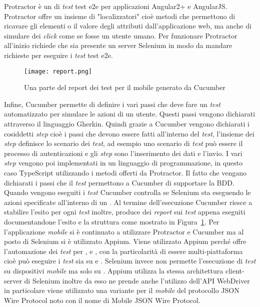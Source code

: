 Protractor è un  di \emph{test} \gls{test e2e} per applicazioni Angular2+ e AngularJS. Protractor offre un insieme di "localizzatori" cioè metodi che permettono di ricavare gli elementi o il valore degli attributi dall'applicazione web, ma anche di simulare dei \emph{click} come se fosse un utente umano. Per funzionare Protractor all'inizio richiede che sia presente un server Selenium in modo da mandare richieste  per eseguire i \emph{test} \gls{test e2e}.\\

\begin{figure}[h] 
	\begin{center}
		\texttt{[image: report.png]}
		\caption{Una parte del report dei test per il mobile generato da Cucumber}\label{fig:testDoc}
	\end{center}
\end{figure}

Infine, Cucumber permette di definire i vari passi che deve fare un \emph{test} automatizzato per simulare le azioni di un utente. Questi passi vengono dichiarati attraverso il linguaggio Gherkin. Quindi grazie a Cucumber vengono dichiarati i cosiddetti \emph{step} cioè i passi che devono essere fatti all'interno del \emph{test}, l'insieme dei \emph{step} definisce lo scenario dei \emph{test}, ad esempio uno scenario di \emph{test} può essere il processo di autenticazioni e gli \emph{step} sono l'inserimento dei dati e l'invio. I vari \emph{step} vengono poi implementati in un linguaggio di programmazione, in questo caso TypeScript utilizzando i metodi offerti da Protractor. Il fatto che vengano dichiarati i passi che il \emph{test} permettono a Cucumber di supportare la \gls{BDD}. Quando vengono eseguiti i \emph{test} Cucumber controlla se Selenium sta eseguendo le azioni specificate all’interno di un . Al termine dell'esecuzione Cucumber riesce a stabilire l'esito per ogni \emph{test} inoltre, produce dei \emph{report} sui \emph{test} appena eseguiti documentandone l'esito e la struttura come mostrato in Figura~\ref{fig:testDoc}.
\clearpage
Per l'applicazione \emph{mobile} si è continuato a utilizzare Protractor e Cucumber ma al posto di Selenium si è utilizzato Appium. Viene utilizzato Appium perché offre l'automazione dei \emph{test} per \textcolor{SchoolColor}{\ap{[g]}}, \textcolor{SchoolColor}{\ap{[g]}} e \textcolor{SchoolColor}{\ap{[g]}}, con la particolarità di essere multi-piattaforma cioè può eseguire i \emph{test} sia su  e . Selenium invece non permette l'esecuzione di \emph{test} su dispositivi \emph{mobile} ma solo su . Appium utilizza la stessa architettura client-server di Selenium inoltre da esso ne prende anche l'utilizzo dell'API WebDriver in particolare viene utilizzato una variante per il \emph{mobile} del protocollo JSON Wire Protocol noto con il nome di Mobile JSON Wire Protocol. 

